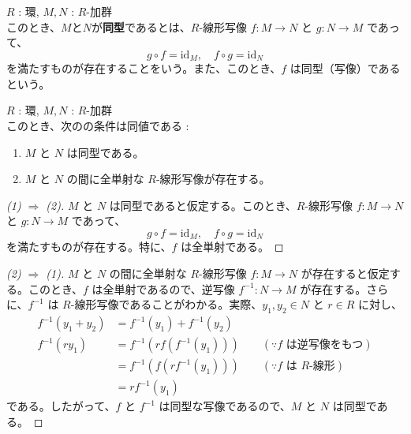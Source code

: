 \documentclass[article,paper=a4paper]{jlreq}
\begin{document}
\begin{dfn}
  \quad $R$ : 環, $M, N$ : $R$-加群\\
  このとき、$M$と$N$が\textbf{同型}であるとは、$R$-\hspace{0pt}線形写像 $f \colon M \to N$ と $g \colon N \to M$ であって、
  \[g \circ f = \mathrm{id}_M, \quad f \circ g = \mathrm{id}_N\]
  を満たすものが存在することをいう。また、このとき、$f$ は同型（写像）であるという。
\end{dfn}

\begin{prop}
  \quad $R$ : 環, $M, N$ : $R$-加群\\
  このとき、次のの条件は同値である :
\begin{enumerate}[label=(\arabic*)\,]
  \item $M$ と $N$ は同型である。
  \item $M$ と $N$ の間に全単射な $R$-\hspace{0pt}線形写像が存在する。
\end{enumerate}
\end{prop}

\begin{proof}[(1) $\Rightarrow$ (2)]
  $M$ と $N$ は同型であると仮定する。このとき、$R$-\hspace{0pt}線形写像 $f \colon M \to N$ と $g \colon N \to M$ であって、
  \[g \circ f = \mathrm{id}_M, \quad f \circ g = \mathrm{id}_N\]
  を満たすものが存在する。特に、$f$ は全単射である。
\end{proof}

\begin{proof}[(2) $\Rightarrow$ (1)]
  $M$ と $N$ の間に全単射な $R$-\hspace{0pt}線形写像 $f \colon M \to N$ が存在すると仮定する。このとき、$f$ は全単射であるので、逆写像 $f^{-1} \colon N \to M$ が存在する。さらに、$f^{-1}$ は $R$-\hspace{0pt}線形写像であることがわかる。実際、$y_1, y_2 \in N$ と $r \in R$ に対し、
  \begin{align*}
    f^{-1}(y_1 + y_2) &= f^{-1}(y_1) + f^{-1}(y_2) \\
    f^{-1}(ry_1) &= f^{-1}(r f(f^{-1}(y_1))) \qquad (\because f \text{ は逆写像をもつ})\\
    &= f^{-1}(f(r f^{-1}(y_1))) \qquad (\because f \text{ は } R\text{-線形})\\
    &= r f^{-1}(y_1)
  \end{align*}
  である。したがって、$f$ と $f^{-1}$ は同型な写像であるので、$M$ と $N$ は同型である。
\end{proof}
\end{document}
